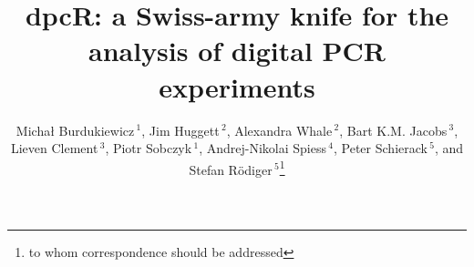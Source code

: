 \documentclass{bioinfo}
\begin{document}

\title[dpcR]{dpcR: a Swiss-army knife for the analysis of digital PCR experiments}
\author[Burdukiewicz \textit{et~al.}]{Micha\l{} Burdukiewicz\,$^{1}$, Jim Huggett\,$^2$, Alexandra Whale\,$^2$, Bart K.M. Jacobs\,$^3$, Lieven Clement\,$^3$, Piotr Sobczyk\,$^{1}$, Andrej-Nikolai Spiess\,$^4$, Peter Schierack\,$^5$, and Stefan R\"odiger\,$^{5}$\footnote{to whom correspondence should be addressed}}
\address{$^{1}$Department of Genomics, Faculty of Biotechnology, University of 
Wroc\l{}aw, Wroc\l{}aw, Poland\\
$^{2}$Molecular and Cell Biology Team, LGC, Teddington, United Kingdom\\
$^{3}$Department of Applied Mathematics, Computer Science and Statistics, Ghent University, Belgium\\
$^{4}$University Medical Center Hamburg-Eppendorf, Hamburg, Germany\\
$^{5}$Faculty of Natural Sciences, Brandenburg University of Technology 
Cottbus--Senftenberg, Germany}



\maketitle
\end{document}
